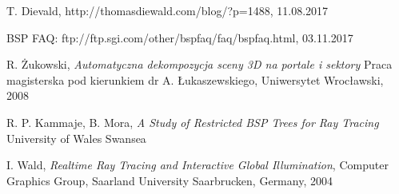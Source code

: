 \documentclass[12pt]{report}
\begin{document}
\begin{thebibliography}{9}
	T. Dievald, http://thomasdiewald.com/blog/?p=1488, 11.08.2017
	
	BSP FAQ: ftp://ftp.sgi.com/other/bspfaq/faq/bspfaq.html, 03.11.2017
	
	R. Żukowski,
	\emph{Automatyczna dekompozycja sceny 3D na portale i sektory}
	Praca magisterska pod kierunkiem dr A. Łukaszewskiego,
	Uniwersytet Wrocławski,
	2008
	
	R. P. Kammaje, B. Mora,
	\emph{A Study of Restricted BSP Trees for Ray Tracing}
	University of Wales Swansea
	
	I. Wald,
	\emph{Realtime Ray Tracing and Interactive Global Illumination},
	Computer Graphics Group, Saarland University Saarbrucken, Germany,
	2004
	
\end{thebibliography}

\listoffigures
\end{document}
